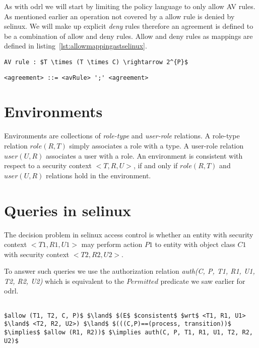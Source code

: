 As with \ac{odrl} we will start by limiting the policy language to only allow AV rules. As mentioned earlier an operation not covered by a allow rule is denied by \ac{selinux}. We will make up explicit \emph{deny} rules therefore an agreement is defined to be a combination of allow and deny rules. Allow and deny rules as mappings are defined in listing~\ref{lst:allowmappingastselinux}.

\lstset{language=AST}
\begin{lstlisting}[frame=single, caption={'allow'/'deny' Rule as a Mapping},label={lst:allowmappingastselinux}]
AV rule : $T \times (T \times C) \rightarrow 2^{P}$
\end{lstlisting}

\lstset{language=AST}
\begin{lstlisting}[frame=single, caption={\ac{selinux} Agreement},label={lst:agreementastselinux}]
<agreement> ::= <avRule> ';' <agreement> 
\end{lstlisting}


\section{Environments}

Environments are collections of \emph{role-type} and \emph{user-role} relations. A role-type relation $role(R, T)$ simply associates a role with a type. A user-role relation $user(U, R)$ associates a user with a role. An environment is consistent with respect to a security context $<T, R, U>$, if and only if $role(R, T)$ and $user(U, R)$ relations hold in the environment. 

\section{Queries in \ac{selinux}}

The decision problem in \ac{selinux} access control is whether an entity with security context $<T1, R1, U1>$ may perform action $P1$ to entity with object class $C1$ with security context $<T2, R2, U2>$.

To answer such queries we use the authorization relation \emph{auth(C, P, T1, R1, U1, T2, R2, U2)} which is equivalent to the $Permitted$ predicate we saw earlier for \ac{odrl}.

\lstset{mathescape, language=AST} 
\begin{lstlisting}[frame=single, caption={$f^{+}_q$ for \ac{selinux}},label={lst:fqplussel}]

$allow (T1, T2, C, P)$ $\land$ $(E$ $consistent$ $wrt$ <T1, R1, U1> $\land$ <T2, R2, U2>) $\land$ $(((C,P)==(process, transition))$ $\implies$ $allow (R1, R2))$ $\implies auth(C, P, T1, R1, U1, T2, R2, U2)$ 

\end{lstlisting}

